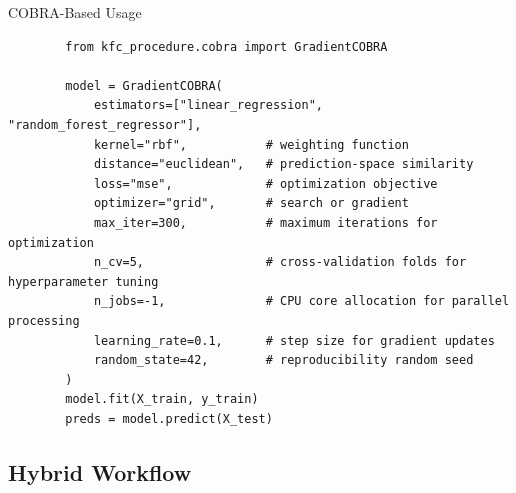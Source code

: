 \begin{frame}[fragile, t]{COBRA-Based Usage}
    \begin{verbatim}
        from kfc_procedure.cobra import GradientCOBRA

        model = GradientCOBRA(
            estimators=["linear_regression", "random_forest_regressor"],
            kernel="rbf",           # weighting function
            distance="euclidean",   # prediction-space similarity
            loss="mse",             # optimization objective
            optimizer="grid",       # search or gradient
            max_iter=300,           # maximum iterations for optimization           
            n_cv=5,                 # cross-validation folds for hyperparameter tuning
            n_jobs=-1,              # CPU core allocation for parallel processing
            learning_rate=0.1,      # step size for gradient updates
            random_state=42,        # reproducibility random seed
        )
        model.fit(X_train, y_train)
        preds = model.predict(X_test)

    \end{verbatim}
\end{frame}

\subsection{Hybrid Workflow}

